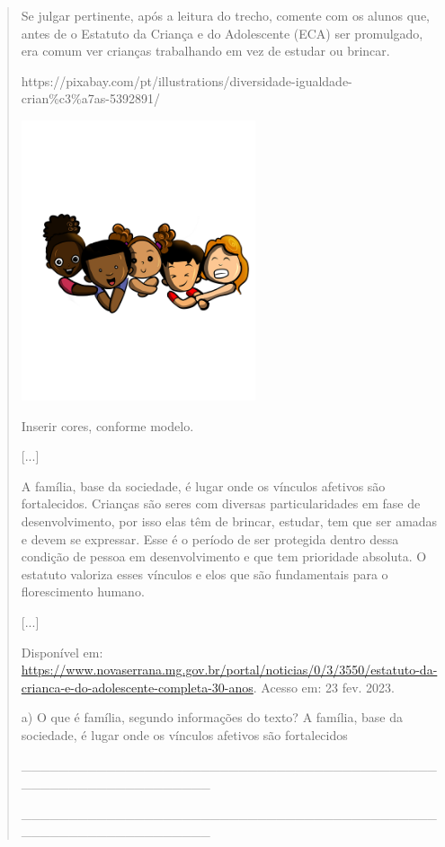 \begin{quote}
Se julgar pertinente, após a leitura do trecho, comente com os alunos
que, antes de o Estatuto da Criança e do Adolescente (ECA) ser
promulgado, era comum ver crianças trabalhando em vez de estudar ou
brincar.

https://pixabay.com/pt/illustrations/diversidade-igualdade-crian\%c3\%a7as-5392891/

\includegraphics[width=2.70833in,height=3.25006in]{media/image27.png}

Inserir cores, conforme modelo.

{[}...{]}

A família, base da sociedade, é lugar onde os vínculos afetivos são
fortalecidos. Crianças são seres com diversas particularidades em fase
de desenvolvimento, por isso elas têm de brincar, estudar, tem que ser
amadas e devem se expressar. Esse é o período de ser protegida dentro
dessa condição de pessoa em desenvolvimento e que tem prioridade
absoluta. O estatuto valoriza esses vínculos e elos que são fundamentais
para o florescimento humano.

{[}...{]}

Disponível em:
\url{https://www.novaserrana.mg.gov.br/portal/noticias/0/3/3550/estatuto-da-crianca-e-do-adolescente-completa-30-anos}.
Acesso em: 23 fev. 2023.

a) O que é família, segundo informações do texto? A família, base da
sociedade, é lugar onde os vínculos afetivos são fortalecidos

\_\_\_\_\_\_\_\_\_\_\_\_\_\_\_\_\_\_\_\_\_\_\_\_\_\_\_\_\_\_\_\_\_\_\_\_\_\_\_\_\_\_\_\_\_\_\_\_\_\_\_\_\_\_\_\_\_\_\_\_\_\_\_\_

\_\_\_\_\_\_\_\_\_\_\_\_\_\_\_\_\_\_\_\_\_\_\_\_\_\_\_\_\_\_\_\_\_\_\_\_\_\_\_\_\_\_\_\_\_\_\_\_\_\_\_\_\_\_\_\_\_\_\_\_\_\_\_\_


\end{quote}
